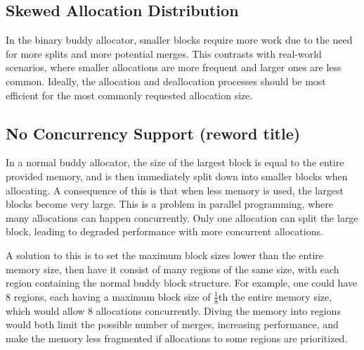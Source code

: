 \subsection{Skewed Allocation Distribution} \label{sec:skewedexpl}
In the binary buddy allocator, smaller blocks require more work due to the need for more splits and more potential merges. This contrasts with real-world scenarios, where smaller allocations are more frequent and larger ones are less common. Ideally, the allocation and deallocation processes should be most efficient for the most commonly requested allocation size.

\subsection{No Concurrency Support (reword title)} \label{sec:concurrencyexpl}

In a normal buddy allocator, the size of the largest block is equal to the entire provided memory, and is then immediately split down into smaller blocks when allocating. A consequence of this is that when less memory is used, the largest blocks become very large. This is a problem in parallel programming, where many allocations can happen concurrently. Only one allocation can split the large block, leading to degraded performance with more concurrent allocations. 

A solution to this is to set the maximum block sizes lower than the entire memory size, then have it consist of many regions of the same size, with each region containing the normal buddy block structure. For example, one could have 8 regions, each having a maximum block size of $\frac{1}{8}$th the entire memory size, which would allow 8 allocations concurrently. Diving the memory into regions would both limit the possible number of merges, increasing performance, and make the memory less fragmented if allocations to some regions are prioritized.

